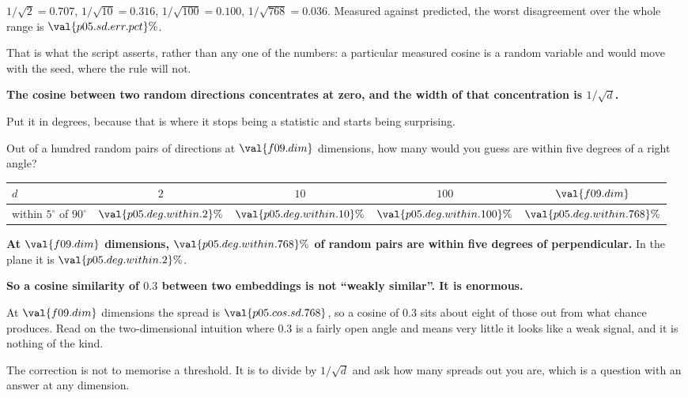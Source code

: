 \begin{fr}
$1/\sqrt{2} = \num{0.707}$, $1/\sqrt{10} = \num{0.316}$, $1/\sqrt{100} = \num{0.100}$,
$1/\sqrt{768} = \num{0.036}$. Measured against predicted, the worst disagreement over
the whole range is $\val{p05.sd.err.pct}\%$.

That is what the script asserts, rather than any one of the numbers: a
particular measured cosine is a random variable and would move with the seed,
where the rule will not.

\textbf{The cosine between two random directions concentrates at zero, and the
width of that concentration is $1/\sqrt{d}$.}
\end{fr}

\begin{fr}
Put it in degrees, because that is where it stops being a statistic and starts
being surprising.

Out of a hundred random pairs of directions at $\val{f09.dim}$ dimensions, how
many would you guess are within five degrees of a right angle?
\dotline
\nextframe
\end{fr}

\begin{fr}
\begin{center}
\begin{tabular}{lcccc}
\toprule
$d$ & $2$ & $10$ & $100$ & $\val{f09.dim}$ \\
\midrule
within $5^{\circ}$ of $90^{\circ}$ & $\val{p05.deg.within.2}\%$ &
  $\val{p05.deg.within.10}\%$ & $\val{p05.deg.within.100}\%$ &
  $\val{p05.deg.within.768}\%$ \\
\bottomrule
\end{tabular}
\end{center}

\textbf{At $\val{f09.dim}$ dimensions, $\val{p05.deg.within.768}\%$ of random
pairs are within five degrees of perpendicular.} In the plane it is
$\val{p05.deg.within.2}\%$.
\end{fr}


\begin{fr}
\begin{trapbox}
\textbf{So a cosine similarity of $\num{0.3}$ between two embeddings is not
\enquote{weakly similar}. It is enormous.}

At $\val{f09.dim}$ dimensions the spread is $\val{p05.cos.sd.768}$, so a cosine
of $\num{0.3}$ sits about eight of those out from what chance produces. Read on the
two-dimensional intuition \dash{} where $\num{0.3}$ is a fairly open angle and means
very little \dash{} it looks like a weak signal, and it is nothing of the kind.

The correction is not to memorise a threshold. It is to divide by
$1/\sqrt{d}$ and ask how many spreads out you are, which is a question with an
answer at any dimension.
\end{trapbox}
\end{fr}

